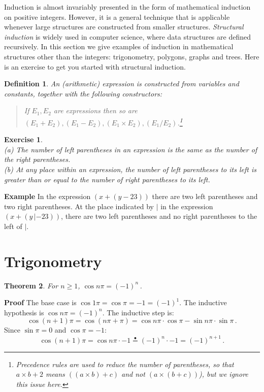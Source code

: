 \documentclass[11pt,a4paper]{report}
\newcommand*{\ih}{\stackrel{\bullet}{=}}
\newtheorem{theorem}{Theorem}
\newtheorem{definition}[theorem]{Definition}
\newtheorem{exercise}{Exercise}
\begin{document}
Induction is almost invariably presented in the form of mathematical induction on positive integers. However, it is a general technique that is applicable whenever large structures are constructed from smaller structures.  \emph{Structural induction} is widely used in computer science, where data structures are defined recursively. In this section we give examples of induction in mathematical structures other than the integers: trigonometry, polygons, graphs and trees. Here is an exercise to get you started with structural induction.

\begin{definition}
An (arithmetic) \emph{expression} is constructed from variables and constants, together with the following constructors:
\begin{quote}
If $E_1, E_2$ are expressions then so are $(E_1+E_2), (E_1-E_2), (E_1\times E_2), (E_1/E_2)$.\footnote{Precedence rules are used to reduce the number of parentheses, so that $a\times b + 2$ means $((a\times b)+c)$ and not $(a\times (b+c))$), but we ignore this issue here.}
\end{quote}
\end{definition}

\begin{exercise}\mbox{}\\
(a) The number of left parentheses in an expression is the same as the number of the right parentheses.\\
(b) At any place within an expression, the number of left parentheses to its left is greater than or equal to the number of right parentheses to its left. 
\end{exercise}

\textbf{Example} In the expression $(x+(y-23))$ there are two left parentheses and two right parentheses. At the place indicated by $|$ in the expression $(x+(y\,|-23))$, there are two left parentheses and no right parentheses to the left of $|$.

\section{Trigonometry}

\begin{theorem}\label{t.cos}
For $n\geq 1$, $\cos n\pi = (-1)^n$\,.
\end{theorem}

\textbf{Proof} The base case is $\cos 1\pi = \cos \pi = -1 = (-1)^1$. The inductive hypothesis is $\cos n\pi = (-1)^n$. The inductive step is:
\[
\cos (n+1)\pi = \cos (n\pi + \pi) = \cos n\pi \cdot \cos \pi - \sin n\pi \cdot \sin \pi\,.
\]
Since $\sin \pi = 0$ and $\cos \pi = -1$:
\[
\cos (n+1)\pi = \cos n\pi \cdot -1 \ih{} (-1)^n \cdot -1 = (-1)^{n+1}\,.
\]
\end{document}

